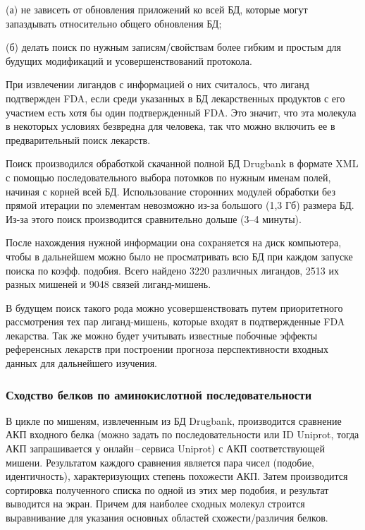 \documentclass[a4paper,14pt]{article}         %
\begin{document}
(а) не зависеть от обновления приложений ко всей БД, которые могут запаздывать относительно общего обновления БД; 

(б) делать поиск по нужным записям/свойствам более гибким и простым для будущих модификаций и усовершенствований протокола.

При извлечении лигандов с информацией о них считалось, что лиганд подтвержден FDA, если среди указанных в БД лекарственных продуктов с его участием есть хотя бы один подтвержденный FDA. Это значит, что эта молекула в некоторых условиях безвредна для человека, так что можно включить ее в предварительный поиск лекарств. 

Поиск производился обработкой скачанной полной БД Drugbank в формате XML с помощью последовательного выбора потомков по нужным именам полей, начиная с корней всей БД. Использование сторонних модулей обработки без прямой итерации по элементам невозможно из-за большого (1,3 Гб) размера БД. Из-за этого поиск производится сравнительно дольше (3--4 минуты).

После нахождения нужной информации она сохраняется на диск компьютера, чтобы в дальнейшем можно было не просматривать всю БД при каждом запуске поиска по коэфф. подобия. Всего найдено 3220 различных лигандов, 2513 их разных мишеней и 9048 связей лиганд-мишень.


В будущем поиск такого рода можно усовершенствовать путем приоритетного рассмотрения тех пар лиганд-мишень, которые входят в подтвержденные FDA лекарства. Так же можно будет учитывать известные побочные эффекты референсных лекарств при построении прогноза перспективности входных данных для дальнейшего изучения.

\subsubsection{Сходство белков по аминокислотной последовательности}

В цикле по мишеням, извлеченным из БД Drugbank, производится сравнение АКП входного белка (можно задать по последовательности или ID Uniprot, тогда АКП запрашивается у онлайн\,--\,сервиса Uniprot) с АКП соответствующей мишени. Результатом каждого сравнения является пара чисел (подобие, идентичность), характеризующих степень похожести АКП. Затем производится сортировка полученного списка по одной из этих мер подобия, и результат выводится на экран. Причем для наиболее сходных молекул строится выравнивание для указания основных областей схожести/различия белков.
\end{document}
